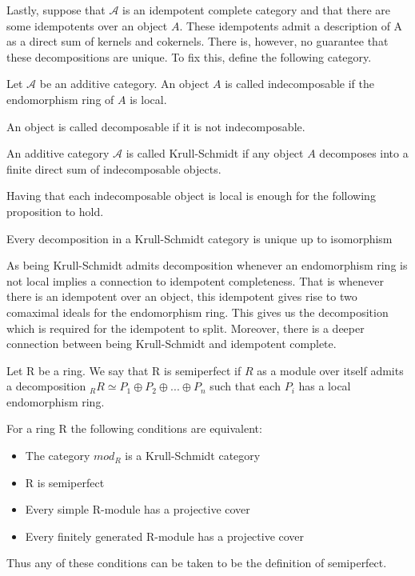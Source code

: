     Lastly, suppose that $\mathcal{A}$ is an idempotent complete category and that there are some idempotents over an object $A$. These idempotents admit a description of A as a direct sum of kernels and cokernels. There is, however, no guarantee that these decompositions are unique. To fix this, define the following category.

    \begin{definition}
        Let $\mathcal{A}$ be an additive category. An object $A$ is called indecomposable if the endomorphism ring of $A$ is local.

        An object is called decomposable if it is not indecomposable.
    \end{definition}

    \begin{definition}
        An additive category $\mathcal{A}$ is called Krull-Schmidt if any object $A$ decomposes into a finite direct sum of indecomposable objects.
    \end{definition}

    Having that each indecomposable object is local is enough for the following proposition to hold.

    \begin{prop}
        Every decomposition in a Krull-Schmidt category is unique up to isomorphism
    \end{prop}

    As being Krull-Schmidt admits decomposition whenever an endomorphism ring is not local implies a connection to idempotent completeness. That is whenever there is an idempotent over an object, this idempotent gives rise to two comaximal ideals for the endomorphism ring. This gives us the decomposition which is required for the idempotent to split. Moreover, there is a deeper connection between being Krull-Schmidt and idempotent complete.

    \begin{definition}
        Let R be a ring. We say that R is semiperfect if $R$ as a module over itself admits a decomposition $_RR\simeq P_1\oplus P_2\oplus ... \oplus P_n$ such that each $P_i$ has a local endomorphism ring.
    \end{definition}

    \begin{remark}
        For a ring R the following conditions are equivalent:
        \begin{itemize}
            \item The category $mod_R$ is a Krull-Schmidt category
            \item R is semiperfect
            \item Every simple R-module has a projective cover
            \item Every finitely generated R-module has a projective cover
        \end{itemize}
        Thus any of these conditions can be taken to be the definition of semiperfect.
    \end{remark}

